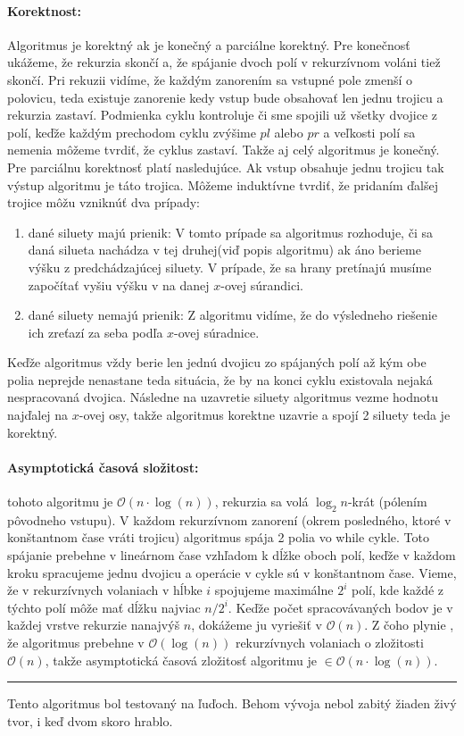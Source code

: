 \documentclass[12pt]{iv003}
\begin{document}
\paragraph{Korektnost:} Algoritmus je korektný ak je konečný a parciálne korektný.
Pre konečnosť ukážeme, že rekurzia skončí a, že spájanie dvoch polí v rekurzívnom voláni tiež skončí. Pri rekuzii vidíme, že každým zanorením sa vstupné pole zmenší o polovicu, teda existuje zanorenie kedy vstup bude obsahovať len jednu trojicu a rekurzia zastaví. Podmienka cyklu kontroluje či sme spojili už všetky dvojice z polí, keďže každým prechodom cyklu zvýšime $pl$ alebo $pr$ a veľkosti polí sa nemenia môžeme tvrdiť, že cyklus zastaví. Takže aj celý algoritmus je konečný.\\
Pre parciálnu korektnosť platí nasledujúce. Ak vstup obsahuje jednu trojicu tak výstup algoritmu je táto trojica. Môžeme induktívne tvrdiť, že pridaním ďalšej trojice môžu vzniknúť dva prípady:
\begin{enumerate}
	\item dané siluety majú prienik: V tomto prípade sa algoritmus rozhoduje, či sa daná silueta nachádza v tej druhej(viď popis algoritmu) ak áno berieme výšku z predchádzajúcej siluety. V prípade, že sa hrany pretínajú musíme započítať vyšiu výšku v na danej $x$-ovej súrandici.
	\item dané siluety nemajú prienik: Z algoritmu vidíme, že do výsledneho riešenie ich zreťazí za seba podľa $x$-ovej súradnice.
\end{enumerate}
Keďže algoritmus vždy berie len jednú dvojicu zo spájaných polí až kým obe polia neprejde nenastane teda  situácia, že by na konci cyklu existovala nejaká nespracovaná dvojica. Následne na uzavretie siluety algoritmus vezme hodnotu najďalej na $x$-ovej osy, takže algoritmus korektne uzavrie a spojí 2 siluety teda je korektný.
\paragraph{Asymptotická časová složitost:} tohoto algoritmu je $\mathcal{O}(n\cdot\log(n))$, rekurzia sa volá $\log_{2}n$-krát (pólením pôvodneho vstupu). V každom rekurzívnom zanorení (okrem posledného, ktoré v konštantnom čase vráti trojicu) algoritmus spája 2 polia vo while cykle. Toto spájanie prebehne v lineárnom čase vzhľadom k dĺžke oboch polí, keďže v každom kroku spracujeme jednu dvojicu a operácie v cykle sú v konštantnom čase. Vieme, že v rekurzívnych volaniach v hĺbke $i$ spojujeme maximálne $2^{i}$ polí, kde každé z týchto polí môže mať dĺžku najviac $n/2^{i}$. Keďže počet spracovávaných bodov je v každej vrstve rekurzie nanajvýš $n$, dokážeme ju vyriešiť v $\mathcal{O}(n)$. Z čoho plynie , že algoritmus prebehne v $\mathcal{O}(\log(n))$ rekurzívnych volaniach o zložitosti $\mathcal{O}(n)$, takže asymptotická časová zložitosť algoritmu je $\in \mathcal{O}(n\cdot\log(n))$. \\
\hrule
\begin{center}
\end{center}
Tento algoritmus bol testovaný na ľuďoch. Behom vývoja nebol zabitý žiaden živý tvor, i keď dvom skoro hrablo.
\end{document}
